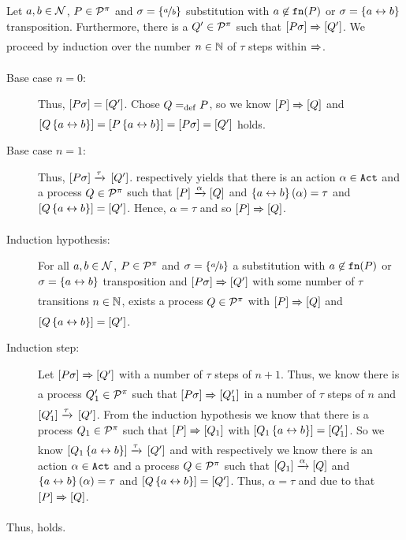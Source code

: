 \begin{prf}
Let $a,b\in\mathcal N$, $P\in\mathcal P^{\pi}$ and $\sigma=\left\{\nicefrac{a}{b}\right\}$ substitution with $a\not\in\mathtt{fn}(P)$ or $\sigma=\left\{a\leftrightarrow{}b\right\}$ transposition. Furthermore, there is a $Q'\in\mathcal P^{\pi}$ such that $\left[P\sigma\right]\xRightarrow{}\left[Q'\right]$. We proceed by induction over the number $n\in\mathbb N$ of $\tau$ steps within $\xRightarrow{}$.
\begin{description}
\item[Base case $n=0$:] Thus, $\left[P\sigma\right]=\left[Q'\right]$. Chose $Q=_{\mathrm{def}}{}P$, so we know $\left[P\right]\xRightarrow{}\left[Q\right]$ and $\left[Q\left\{a\leftrightarrow{}b\right\}\right]=\left[P\left\{a\leftrightarrow{}b\right\}\right]=\left[P\sigma\right]=\left[Q'\right]$ holds.

\item[Base case $n=1$:] Thus, $\left[P\sigma\right]\xrightarrow{\tau}{}\left[Q'\right]$.  respectively  yields that there is an action $\alpha\in\mathtt{Act}$ and a process $Q\in\mathcal P^{\pi}$ such that $\left[P\right]\xrightarrow{\alpha}\left[Q\right]$ and $\left\{a\leftrightarrow{}b\right\}(\alpha)=\tau$ and $\left[Q\left\{a\leftrightarrow{}b\right\}\right]=\left[Q'\right]$. Hence, $\alpha=\tau$ and so $\left[P\right]\xRightarrow{}\left[Q\right]$.

\item[Induction hypothesis:] For all $a,b\in\mathcal N$, $P\in\mathcal P^{\pi}$ and $\sigma=\left\{\nicefrac{a}{b}\right\}$ a substitution with $a\not\in\mathtt{fn}(P)$ or $\sigma=\left\{a\leftrightarrow{}b\right\}$ transposition and $\left[P\sigma\right]\xRightarrow{}\left[Q'\right]$ with some number of $\tau$ transitions $n\in\mathbb N$, exists a process $Q\in\mathcal P^{\pi}$ with $\left[P\right]\xRightarrow{}\left[Q\right]$ and $\left[Q\left\{a\leftrightarrow{}b\right\}\right]=\left[Q'\right]$.

\item[Induction step:] Let $\left[P\sigma\right]\xRightarrow{}\left[Q'\right]$ with a number of $\tau$ steps of $n+1$. Thus, we know there is a process $Q_1'\in\mathcal P^{\pi}$ such that $\left[P\sigma\right]\xRightarrow{}\left[Q_1'\right]$ in a number of $\tau$ steps of $n$ and $\left[Q_1'\right]\xrightarrow{\tau}{}\left[Q'\right]$. From the induction hypothesis we know that there is a process $Q_1\in\mathcal P^{\pi}$ such that $\left[P\right]\xRightarrow{}\left[Q_1\right]$ with $\left[Q_1\left\{a\leftrightarrow{}b\right\}\right]=\left[Q_1'\right]$. So we know $\left[Q_1\left\{a\leftrightarrow{}b\right\}\right]\xrightarrow{\tau}{}\left[Q'\right]$ and with  respectively  we know there is an action $\alpha\in\mathtt{Act}$ and a process $Q\in\mathcal P^{\pi}$ such that $\left[Q_1\right]\xrightarrow{\alpha}\left[Q\right]$ and $\left\{a\leftrightarrow{}b\right\}(\alpha)=\tau$ and $\left[Q\left\{a\leftrightarrow{}b\right\}\right]=\left[Q'\right]$. Thus, $\alpha=\tau$ and due to that $\left[P\right]\xRightarrow{}\left[Q\right]$.
\end{description}
Thus,  holds.
\end{prf}

